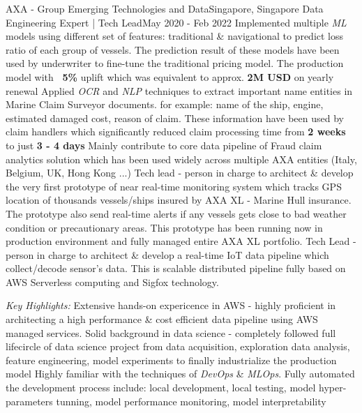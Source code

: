     \resumeSubheading
      {AXA - Group Emerging Technologies and Data}{Singapore, Singapore}
      {Data Engineering Expert | Tech Lead}{May 2020 - Feb 2022}
      \resumeItemListStart
          {Implemented multiple \emph{ML} models using different set of features: traditional \& navigational to predict loss ratio of each group of vessels. The prediction result of these models have been used by underwriter to fine-tune the traditional pricing model. The production model with \textbf{~5\%} uplift which was equivalent to approx. \textbf{2M USD} on yearly renewal}
          {Applied \emph{OCR} and \emph{NLP} techniques to extract important name entities in Marine Claim Surveyor documents. for example: name of the ship, engine, estimated damaged cost, reason of claim. These information have been used by claim handlers which significantly reduced claim processing time from \textbf{2 weeks} to just \textbf{3 - 4 days}}
          {Mainly contribute to core data pipeline of Fraud claim analytics solution which has been used widely across multiple AXA entities (Italy, Belgium, UK, Hong Kong ...)}
          {Tech lead - person in charge to architect \& develop the very first prototype of near real-time monitoring system which tracks GPS location of thousands vessels/ships insured by AXA XL - Marine Hull insurance. The prototype also send real-time alerts if any vessels gets close to bad weather condition or precautionary areas. This prototype has been running now in production environment and fully managed entire AXA XL portfolio.}
          {Tech Lead - person in charge to architect \& develop a real-time IoT data pipeline which collect/decode sensor’s data. This is scalable distributed pipeline fully based on AWS Serverless computing and Sigfox technology.}
      \resumeItemListEnd

      \emph{Key Highlights:}
      \resumeItemListStart
          {Extensive hands-on expericence in AWS - highly proficient in architecting a high performance \& cost efficient data pipeline using AWS managed services.}
          {Solid background in data science - completely followed full lifecircle of data science project from data acquisition, exploration data analysis, feature engineering,
          model experiments to finally industrialize the production model}
          {Highly familiar with the techniques of \emph{DevOps} \& \emph{MLOps}. Fully automated the development process include: local development, local testing, model hyper-parameters tunning, model performance monitoring, model interpretability}
      \resumeItemListEnd

